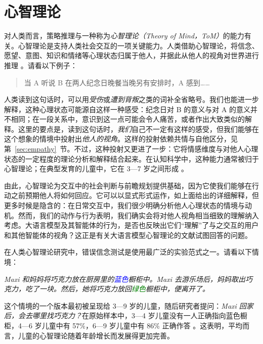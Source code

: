 \section{心智理论} \label{sec:tom}\label{sec:theoryofmind}
对人类而言，策略推理与一种称为\emph{心智理论（Theory of Mind，ToM）}的能力有关。心智理论是支持人类社会交互的一项关键能力。人类借助心智理论，将信念、愿望、意图、知识和情绪等心理状态归属于他人，并据此从他人的视角对世界进行推理 \citep{premack1978does, apperly2011mindreaders}。请看以下例子：

\begin{quotation}
     \noindent 当 A 听说 B 在两人纪念日晚餐当晚另有安排时，A 感到……
\end{quotation}

\noindent 人类读到这句话时，可以用{\em 受伤}或{\em 遭到背叛}之类的词补全省略号。我们也能进一步解释，这种心理状态可能源自这样一种感受：纪念日对 B 的意义与对 A 的意义并不相同；在一段关系中，意识到这一点可能会令人痛苦，或者作出大致类似的解释。这里的要点是，读到这句话时，\textit{我们}自己不一定有这样的感受，但我们能够在这个想象的情境中投射出\emph{他人的视角}。这样的投射依赖共情与自他区分，见第~\ref{sec:empathy}~节。不过，这种投射又更进了一步：它将情感维度与对他人心理状态的一定程度的理论分析和解释结合起来。在认知科学中，这种能力通常被归于心智理论；在典型发育的儿童中，它在 3—7 岁之间形成 \citep{apperly2011mindreaders}。

由此，心智理论为交互中的社会判断与前瞻规划提供基础，因为它使我们能够在行动之前预期他人将如何回应。它可以以显式形式运作，如上面给出的详细解释，但更多时候是隐含的：在日常交互中，我们很少明确分析他人心理状态的情境与动机。然而，我们的动作与行为表明，我们确实会将对他人视角相当细致的理解纳入考虑。大语言模型及其智能体的行为，是否也反映出它们“理解”了与之交互的用户和其他智能体的视角？这正是有关大语言模型心智理论的文献试图回答的问题。

在人类心智理论研究中，错误信念测试是使用最广泛的实验范式之一。请看以下情境：

\begin{tcolorbox}[
    colback=white,
    arc=4pt,
    boxrule=0.5pt,
]
\small\textit{Maxi 和妈妈将巧克力放在厨房里的\textcolor{blue}{蓝色}橱柜中。Maxi 去游乐场后，妈妈取出巧克力，吃了一块。然后，她将巧克力放回\textcolor{green}{绿色}橱柜中，便离开了。}
\end{tcolorbox}

\noindent
这个情境的一个版本最初被呈现给 3—9 岁的儿童，随后研究者提问：{\em Maxi 回家后，会去哪里找巧克力？}在原始样本中，3—4 岁儿童没有一人正确指向蓝色橱柜，4—6 岁儿童中有 57\%，6—9 岁儿童中有 86\% 正确作答 \citep{wimmer1983beliefs}。这表明，平均而言，儿童的心智理论随着年龄增长而发展得更加完善。

